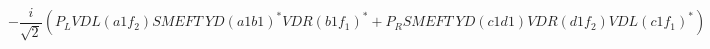 %
\begin{dmath*}
%
  -  \frac{i}{\sqrt{2}} \left(P_L VDL\left(a1 f_2\right) SMEFT \  YD(a1 b1)^* VDR\left(b1 f_1\right)^* + P_R SMEFT \  YD(c1 d1) VDR\left(d1 f_2\right) VDL\left(c1 f_1\right)^*\right)
%
\end{dmath*}
%
